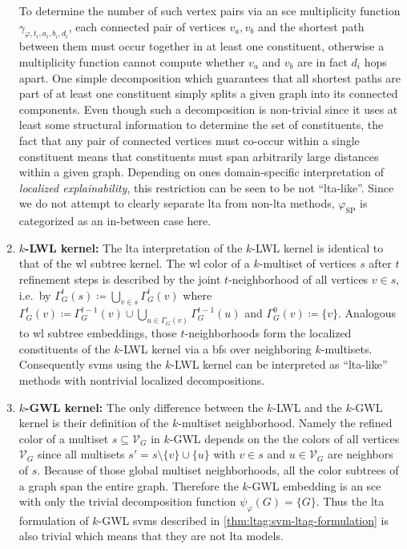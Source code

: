 \begin{enumerate}[label=\textbf{\arabic*.},ref={\arabic*}]
		To determine the number of such vertex pairs via an \ac{sce} multiplicity function $\gamma_{\varphi, t_i, a_i, b_i, d_i}$, each connected pair of vertices $v_a, v_b$ and the shortest path between them must occur together in at least one constituent, otherwise a multiplicity function cannot compute whether $v_a$ and $v_b$ are in fact $d_i$ hops apart.
		One simple decomposition which guarantees that all shortest paths are part of at least one constituent simply splits a given graph into its connected components.
		Even though such a decomposition is non-trivial since it uses at least some structural information to determine the set of constituents, the fact that any pair of connected vertices must co-occur within a single constituent means that constituents must span arbitrarily large distances within a given graph.
		Depending on ones domain-specific interpretation of \textit{localized explainability}, this restriction can be seen to be not ``\acs{lta}-like''.
		Since we do not attempt to clearly separate \ac{lta} from non-\acs{lta} methods, $\varphi_{\text{SP}}$ is categorized as an in-between case here.
	\item \textbf{$k$-LWL kernel:}\label{itm:ltag:klwl-lta-formulation}
		The \ac{lta} interpretation of the $k$-LWL kernel is identical to that of the \ac{wl} subtree kernel.
		The \ac{wl} color of a $k$-multiset of vertices $s$ after $t$ refinement steps is described by the joint $t$-neighborhood of all vertices $v \in s$, i.e.\ by $\Gamma_{G}^t(s) \coloneqq \bigcup_{v \in s} \Gamma_{G}^t(v)$ where $\Gamma_{G}^t(v) \coloneqq \Gamma_{G}^{t-1}(v) \cup \bigcup_{u \in \Gamma_{G}(v)} \Gamma_{G}^{t-1}(u)$ and $\Gamma_{G}^0(v) \coloneqq \{ v \}$.
		Analogous to \ac{wl} subtree embeddings, those $t$-neighborhoods form the localized constituents of the $k$-LWL kernel via a \ac{bfs} over neighboring $k$-multisets.
		Consequently \acp{svm} using the $k$-LWL kernel can be interpreted as ``\acs{lta}-like'' methods with nontrivial localized decompositions.
	\item \textbf{$k$-GWL kernel:}\label{itm:ltag:kgwl-lta-formulation}
		The only difference between the $k$-LWL and the $k$-GWL kernel is their definition of the $k$-multiset neighborhood.
		Namely the refined color of a multiset $s \subseteq \mathcal{V}_G$ in $k$-GWL depends on the the colors of all vertices $\mathcal{V}_G$ since all multisets $s' = s \setminus \{ v \} \cup \{ u \}$ with $v \in s$ and $u \in \mathcal{V}_G$ are neighbors of $s$.
		Because of those global multiset neighborhoods, all the color subtrees of a graph span the entire graph.
		Therefore the $k$-GWL embedding is an \ac{sce} with only the trivial decomposition function $\psi_{\varphi}(G) = \{ G \}$.
		Thus the \ac{lta} formulation of $k$-GWL \acp{svm} described in \cref{thm:ltag:svm-ltag-formulation} is also trivial which means that they are not \ac{lta} models.
\end{enumerate}

